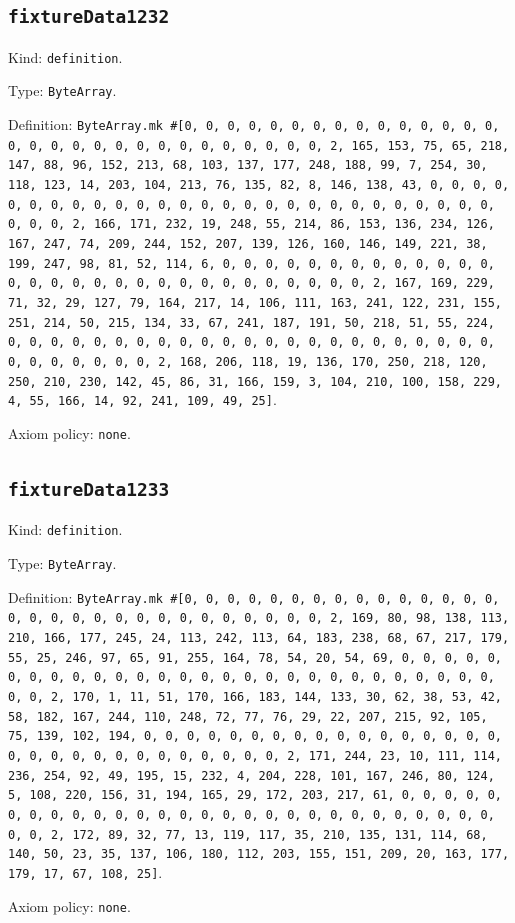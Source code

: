 \documentclass[11pt]{article}
\begin{document}
\subsection*{\texttt{fixtureData1232}}
\noindent Kind: \texttt{definition}.\par
\noindent Type: \texttt{ByteArray}.\par
\noindent Definition: \texttt{ByteArray.mk \#[0, 0, 0, 0, 0, 0, 0, 0, 0, 0, 0, 0, 0, 0, 0, 0, 0, 0, 0, 0, 0, 0, 0, 0, 0, 0, 0, 0, 0, 0, 2, 165, 153, 75, 65, 218, 147, 88, 96, 152, 213, 68, 103, 137, 177, 248, 188, 99, 7, 254, 30, 118, 123, 14, 203, 104, 213, 76, 135, 82, 8, 146, 138, 43, 0, 0, 0, 0, 0, 0, 0, 0, 0, 0, 0, 0, 0, 0, 0, 0, 0, 0, 0, 0, 0, 0, 0, 0, 0, 0, 0, 0, 0, 0, 2, 166, 171, 232, 19, 248, 55, 214, 86, 153, 136, 234, 126, 167, 247, 74, 209, 244, 152, 207, 139, 126, 160, 146, 149, 221, 38, 199, 247, 98, 81, 52, 114, 6, 0, 0, 0, 0, 0, 0, 0, 0, 0, 0, 0, 0, 0, 0, 0, 0, 0, 0, 0, 0, 0, 0, 0, 0, 0, 0, 0, 0, 0, 0, 2, 167, 169, 229, 71, 32, 29, 127, 79, 164, 217, 14, 106, 111, 163, 241, 122, 231, 155, 251, 214, 50, 215, 134, 33, 67, 241, 187, 191, 50, 218, 51, 55, 224, 0, 0, 0, 0, 0, 0, 0, 0, 0, 0, 0, 0, 0, 0, 0, 0, 0, 0, 0, 0, 0, 0, 0, 0, 0, 0, 0, 0, 0, 0, 2, 168, 206, 118, 19, 136, 170, 250, 218, 120, 250, 210, 230, 142, 45, 86, 31, 166, 159, 3, 104, 210, 100, 158, 229, 4, 55, 166, 14, 92, 241, 109, 49, 25]}.\par
\noindent Axiom policy: \texttt{none}.\par
\subsection*{\texttt{fixtureData1233}}
\noindent Kind: \texttt{definition}.\par
\noindent Type: \texttt{ByteArray}.\par
\noindent Definition: \texttt{ByteArray.mk \#[0, 0, 0, 0, 0, 0, 0, 0, 0, 0, 0, 0, 0, 0, 0, 0, 0, 0, 0, 0, 0, 0, 0, 0, 0, 0, 0, 0, 0, 0, 2, 169, 80, 98, 138, 113, 210, 166, 177, 245, 24, 113, 242, 113, 64, 183, 238, 68, 67, 217, 179, 55, 25, 246, 97, 65, 91, 255, 164, 78, 54, 20, 54, 69, 0, 0, 0, 0, 0, 0, 0, 0, 0, 0, 0, 0, 0, 0, 0, 0, 0, 0, 0, 0, 0, 0, 0, 0, 0, 0, 0, 0, 0, 0, 2, 170, 1, 11, 51, 170, 166, 183, 144, 133, 30, 62, 38, 53, 42, 58, 182, 167, 244, 110, 248, 72, 77, 76, 29, 22, 207, 215, 92, 105, 75, 139, 102, 194, 0, 0, 0, 0, 0, 0, 0, 0, 0, 0, 0, 0, 0, 0, 0, 0, 0, 0, 0, 0, 0, 0, 0, 0, 0, 0, 0, 0, 0, 0, 2, 171, 244, 23, 10, 111, 114, 236, 254, 92, 49, 195, 15, 232, 4, 204, 228, 101, 167, 246, 80, 124, 5, 108, 220, 156, 31, 194, 165, 29, 172, 203, 217, 61, 0, 0, 0, 0, 0, 0, 0, 0, 0, 0, 0, 0, 0, 0, 0, 0, 0, 0, 0, 0, 0, 0, 0, 0, 0, 0, 0, 0, 0, 0, 2, 172, 89, 32, 77, 13, 119, 117, 35, 210, 135, 131, 114, 68, 140, 50, 23, 35, 137, 106, 180, 112, 203, 155, 151, 209, 20, 163, 177, 179, 17, 67, 108, 25]}.\par
\noindent Axiom policy: \texttt{none}.\par
\end{document}
